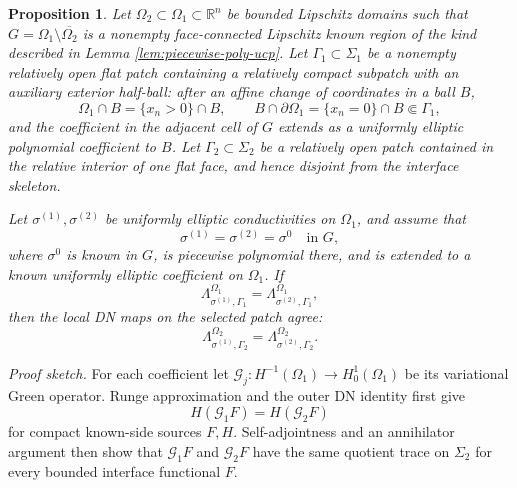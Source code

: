 \documentclass[11pt,oneside]{article}
\newtheorem{proposition}[theorem]{Proposition}
\newcommand{\R}{\mathbb R}
\newcommand{\DN}{\Lambda}
\begin{document}
\begin{proposition}
\label{prop:inner-extension}
Let \(\Omega_2\subset\Omega_1\subset\R^n\) be bounded Lipschitz domains such
that \(G=\Omega_1\setminus\overline{\Omega_2}\) is a nonempty face-connected
Lipschitz known region of the kind described in Lemma
\ref{lem:piecewise-poly-ucp}.  Let \(\Gamma_1\subset\Sigma_1\) be a nonempty
relatively open flat patch containing a relatively compact subpatch with an
auxiliary exterior half-ball: after an affine change of coordinates in a ball
\(B\),
\begin{equation}
  \Omega_1\cap B=\{x_n>0\}\cap B,
  \qquad
  B\cap\partial\Omega_1=\{x_n=0\}\cap B\Subset \Gamma_1,
\end{equation}
and the coefficient in the adjacent cell of \(G\) extends as a uniformly
elliptic polynomial coefficient to \(B\).  Let
\(\Gamma_2\subset\Sigma_2\) be a relatively open patch contained in the
relative interior of one flat face, and hence disjoint from the interface
skeleton.

Let \(\sigma^{(1)},\sigma^{(2)}\) be uniformly elliptic conductivities on
\(\Omega_1\), and assume that
\begin{equation}
  \sigma^{(1)}=\sigma^{(2)}=\sigma^0
  \quad\text{in }G,
\end{equation}
where \(\sigma^0\) is known in \(G\), is piecewise polynomial there, and is
extended to a known uniformly elliptic coefficient on \(\Omega_1\).  If
\begin{equation}
  \DN^{\Omega_1}_{\sigma^{(1)},\Gamma_1}
  =\DN^{\Omega_1}_{\sigma^{(2)},\Gamma_1},
  \label{eq:outer-local-equality-inner-section}
\end{equation}
then the local DN maps on the selected patch agree:
\begin{equation}
  \DN^{\Omega_2}_{\sigma^{(1)},\Gamma_2}
  =\DN^{\Omega_2}_{\sigma^{(2)},\Gamma_2}.
  \label{eq:inner-dn-equality}
\end{equation}
\end{proposition}

\noindent\emph{Proof sketch.}
For each coefficient let \(\mathcal G_j:H^{-1}(\Omega_1)\to
H^1_0(\Omega_1)\) be its variational Green operator.  Runge approximation and
the outer DN identity first give
\begin{equation}
  H(\mathcal G_1F)=H(\mathcal G_2F)
\end{equation}
for compact known-side sources \(F,H\).  Self-adjointness and an annihilator
argument then show that \(\mathcal G_1F\) and \(\mathcal G_2F\) have the same
quotient trace on \(\Sigma_2\) for every bounded interface functional \(F\).
\end{document}

